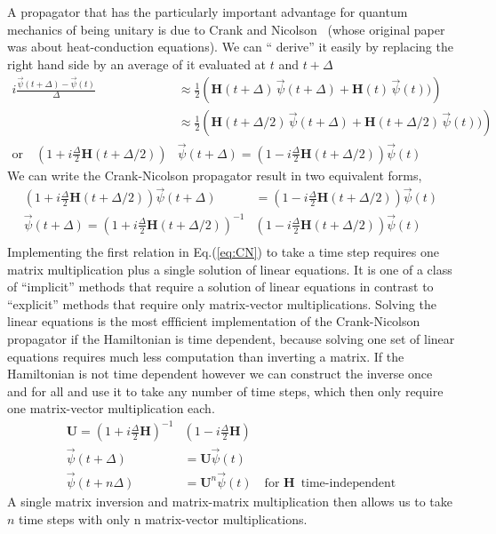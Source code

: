 \documentclass[aps,amssymb,superscriptaddress,floatfix]{revtex4}
\begin{document}
A  propagator that has the particularly important advantage for quantum mechanics of being unitary is due to Crank and Nicolson~\cite{Crank1996} (whose original paper was about heat-conduction equations).  We can `` derive'' it easily by replacing the right hand side by an average of it evaluated at $t$ and $t+\Delta$
\begin{equation}
\begin{split}
i \frac{\vec{\psi}(t+\Delta) - \vec{\psi}(t)}{\Delta} & \approx \frac{1}{2} \left( \mathbf{H}(t+\Delta)\, \vec{\psi}(t+\Delta) +\mathbf{H}(t)\, \vec{\psi}(t))\right) \\
&\approx \frac{1}{2} \left( \mathbf{H}(t+\Delta/2)\, \vec{\psi}(t+\Delta) +\mathbf{H}(t+\Delta/2)\, \vec{\psi}(t))\right) \\
\textrm{or}\quad  \left(1 + i\frac{\Delta}{2} \mathbf{H}(t+\Delta/2)\right) & \vec{\psi}(t+\Delta) = \left(1 - i \frac{\Delta}{2} \mathbf{H}(t+\Delta/2)\right) \vec{\psi}(t)
\end{split}
\end{equation}
We can write the Crank-Nicolson propagator result in two equivalent forms,
\begin{equation}
\boxed{
\begin{split}
 \left(1 + i\frac{\Delta}{2} \mathbf{H}(t+\Delta/2)\right) \vec{\psi}(t+\Delta) &= \left(1 - i \frac{\Delta}{2} \mathbf{H}(t+\Delta/2)\right) \vec{\psi}(t) \\
 \vec{\psi}(t+\Delta) =  \left(1 + i\frac{\Delta}{2} \mathbf{H}(t+\Delta/2)\right)^{-1}  &   \left(1 - i \frac{\Delta}{2} \mathbf{H}(t+\Delta/2)\right) \vec{\psi}(t) \\
\end{split}
}
\label{eq:CN}
\end{equation}
Implementing the first relation in Eq.(\ref{eq:CN}) to take a time step requires one matrix multiplication plus a single solution of linear equations.  It is one of a class of ``implicit'' methods that require a solution of linear equations in contrast to ``explicit'' methods that require only matrix-vector multiplications.  Solving the linear equations is the most effficient implementation of the Crank-Nicolson propagator if the Hamiltonian is time dependent, because solving one set of linear equations requires much less computation than inverting a matrix.  If the Hamiltonian is not time dependent however we can construct the inverse once and for all and use it to take any number of time steps, which then only require one matrix-vector multiplication each.
\begin{equation}
\begin{split} 
 \mathbf{U} =  \left(1 + i\frac{\Delta}{2} \mathbf{H}\right)^{-1}  &   \left(1 - i \frac{\Delta}{2} \mathbf{H}\right) \\
 \vec{\psi}(t+\Delta) &=  \mathbf{U}\vec{\psi}(t) \\
  \vec{\psi}(t+n \Delta) &=  \mathbf{U}^n\vec{\psi}(t) \quad \textrm{for }\mathbf{H} \, \textrm{ time-independent}
  \end{split}
\label{eq:CN2}
\end{equation}
A single matrix inversion and matrix-matrix multiplication then allows us to take $n$ time steps with only n matrix-vector multiplications.
\end{document}
